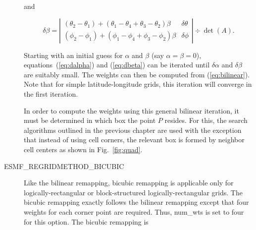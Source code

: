 \begin{description}
     and

\begin{equation}\label{eq:dbeta}
\delta\beta = \left|\begin{array}{cc}
(\theta_2-\theta_1) + (\theta_1-\theta_4+\theta_3-\theta_2)\beta &
\delta\theta \\
(\phi_2-\phi_1) + (\phi_1-\phi_4+\phi_3-\phi_2)\beta &
\delta\phi 
\end{array}\right| \div \det(A).
\end{equation}

     Starting with an initial guess for $\alpha$ and $\beta$ (say 
     $\alpha=\beta=0$), equations~(\ref{eq:dalpha}) and (\ref{eq:dbeta})
     can be iterated until $\delta\alpha$ and $\delta\beta$ are suitably small.
     The weights can then be computed from (\ref{eq:bilinear}).  Note that
     for simple latitude-longitude grids, this iteration will converge in the
     first iteration.

     In order to compute the weights using this general bilinear iteration,
     it must be determined in which box the point $P$ resides.  For this,
     the search algorithms outlined in the previous chapter are used with
     the exception that instead of using cell corners, the relevant box is
     formed by neighbor cell centers as shown in Fig.~\ref{fig:quad}.

\item[ESMF\_REGRIDMETHOD\_BICUBIC ]

     Like the bilinear remapping, bicubic remapping is applicable
     only for logically-rectangular or block-structured logically-rectangular
     grids.  The bicubic remapping exactly follows the bilinear remapping except
     that four weights for each corner point are required.  Thus, num\_wts
     is set to four for this option.  The bicubic remapping is


\end{description}
